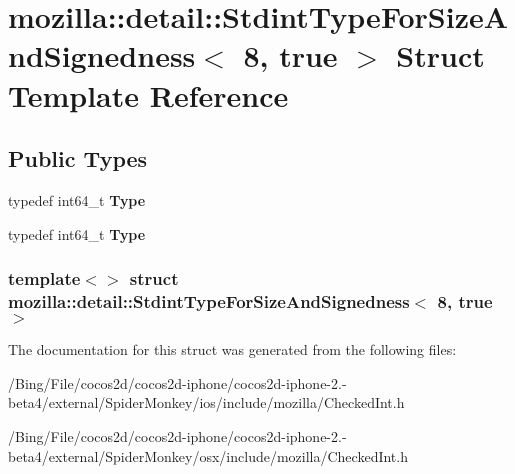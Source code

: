 \hypertarget{structmozilla_1_1detail_1_1_stdint_type_for_size_and_signedness_3_018_00_01true_01_4}{\section{mozilla\-:\-:detail\-:\-:Stdint\-Type\-For\-Size\-And\-Signedness$<$ 8, true $>$ Struct Template Reference}
\label{structmozilla_1_1detail_1_1_stdint_type_for_size_and_signedness_3_018_00_01true_01_4}
}
\subsection*{Public Types}
\begin{DoxyCompactItemize}
\item 
\hypertarget{structmozilla_1_1detail_1_1_stdint_type_for_size_and_signedness_3_018_00_01true_01_4_a6783e141bb41ad2cb4a2dcfcea902474}{typedef int64\-\_\-t {\bfseries Type}}\label{structmozilla_1_1detail_1_1_stdint_type_for_size_and_signedness_3_018_00_01true_01_4_a6783e141bb41ad2cb4a2dcfcea902474}

\item 
\hypertarget{structmozilla_1_1detail_1_1_stdint_type_for_size_and_signedness_3_018_00_01true_01_4_a6783e141bb41ad2cb4a2dcfcea902474}{typedef int64\-\_\-t {\bfseries Type}}\label{structmozilla_1_1detail_1_1_stdint_type_for_size_and_signedness_3_018_00_01true_01_4_a6783e141bb41ad2cb4a2dcfcea902474}

\end{DoxyCompactItemize}
\subsubsection*{template$<$$>$ struct mozilla\-::detail\-::\-Stdint\-Type\-For\-Size\-And\-Signedness$<$ 8, true $>$}



The documentation for this struct was generated from the following files\-:\begin{DoxyCompactItemize}
\item 
/\-Bing/\-File/cocos2d/cocos2d-\/iphone/cocos2d-\/iphone-\/2.-\/beta4/external/\-Spider\-Monkey/ios/include/mozilla/Checked\-Int.\-h\item 
/\-Bing/\-File/cocos2d/cocos2d-\/iphone/cocos2d-\/iphone-\/2.-\/beta4/external/\-Spider\-Monkey/osx/include/mozilla/Checked\-Int.\-h\end{DoxyCompactItemize}
